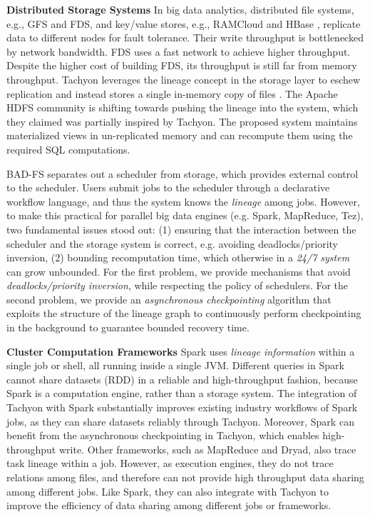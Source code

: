 \documentclass[twocolumn]{article}
\begin{document}
\noindent
\textbf{Distributed Storage Systems} In big data analytics, distributed file systems, e.g., GFS and FDS, and key/value stores, e.g., RAMCloud and HBase \cite{hbase:2015}, replicate data to different nodes for fault tolerance. Their write throughput is bottlenecked by network bandwidth. FDS uses a fast network to achieve higher throughput. Despite the higher cost of building FDS, its throughput is still far from memory throughput. Tachyon leverages the lineage concept in the storage layer to eschew replication and instead stores a single in-memory copy of files \cite{Li:2014}. The Apache HDFS community is shifting towards pushing the lineage into the system, which they claimed was partially inspired by Tachyon. The proposed system maintains materialized views in un-replicated memory and can recompute them using the required SQL computations.

BAD-FS separates out a scheduler from storage, which provides external control to the scheduler. 
Users submit jobs to the scheduler through a declarative workflow language, 
and thus the system knows the \textit{lineage} among jobs. 
However, to make this practical for parallel big data engines (e.g. Spark, MapReduce, Tez), two fundamental issues stood out: (1) ensuring that the interaction between the scheduler and the storage system is correct, e.g. avoiding deadlocks/priority inversion, (2) bounding recomputation time, which otherwise in a \textit{24/7 system} can grow unbounded. 
For the first problem, we provide mechanisms that avoid \textit{deadlocks/priority inversion}, while respecting the policy of schedulers. For the second problem, we provide an \textit{asynchronous checkpointing} algorithm that exploits the structure of the lineage graph to continuously perform checkpointing in the background to guarantee bounded recovery time.

\noindent
\textbf{Cluster Computation Frameworks} 
Spark uses \textit{lineage information} within a single job or shell, all running inside a single JVM. 
Different queries in Spark cannot share datasets (RDD) in a reliable and high-throughput fashion, 
because Spark is a computation engine, rather than a storage system. 
The integration of Tachyon with Spark substantially improves existing industry workflows of Spark jobs, 
as they can share datasets reliably through Tachyon. 
Moreover, Spark can benefit from the asynchronous checkpointing in Tachyon, which enables high-throughput write.
Other frameworks, such as MapReduce and Dryad, also trace task lineage within a job. 
However, as execution engines, they do not trace relations among files, 
and therefore can not provide high throughput data sharing among different jobs. 
Like Spark, they can also integrate with Tachyon to improve the efficiency of data sharing among different jobs or frameworks.
\end{document}
